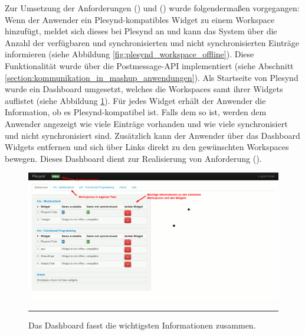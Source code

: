 Zur Umsetzung der Anforderungen  (\emph{\requirementWidgetInformSystem}) und  (\emph{\requirementWidgetInformUser})  wurde folgendermaßen vorgegangen: Wenn der Anwender ein Plesynd-kompatibles Widget zu einem Workspace hinzufügt, meldet sich dieses bei Plesynd an und kann das System über die Anzahl der verfügbaren und synchronisierten und nicht synchronisierten Einträge informieren (siehe Abbildung \ref{fig:plesynd_workspace_offline}). Diese Funktionalität wurde über die Postmessage-\ac{API} implementiert (siehe Abschnitt \ref{section:kommunikation_in_mashup_anwendungen}). Als Startseite von Plesynd wurde ein Dashboard umgesetzt, welches die Workspaces samt ihrer Widgets auflistet (siehe Abbildung \ref{fig:plesynd_dashboard}). Für jedes Widget erhält der Anwender die Information, ob es Plesynd-kompatibel ist. Falls dem so ist, werden dem Anwender angezeigt wie viele Einträge vorhanden und wie viele synchronisiert und nicht synchronisiert sind. Zusätzlich kann der Anwender über das Dashboard Widgets entfernen und sich über Links direkt zu den gewünschten Workspaces bewegen. Dieses Dashboard dient zur Realisierung von Anforderung  (\emph{\requirementDashboard}).
\begin{figure}[H]
  \centering
  \includegraphics[width=\textwidth]{./Figures/plesynd_dashboard.png}
    \rule{35em}{0.5pt}
  \caption[Plesynd User"=Interface: Dashboard]{Das Dashboard fasst die wichtigsten Informationen zusammen.}
  \label{fig:plesynd_dashboard}
\end{figure}

